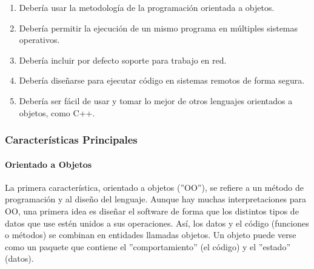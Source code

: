 \begin{description}
\begin{enumerate}
 \item Deber\'ia usar la metodolog\'ia de la programaci\'on orientada a objetos.
 \item Deber\'ia permitir la ejecuci\'on de un mismo programa en m\'ultiples sistemas operativos. 
 \item Deber\'ia incluir por defecto soporte para trabajo en red.
 \item Deber\'ia dise\~narse para ejecutar c\'odigo en sistemas remotos de forma segura.
 \item Deber\'ia ser f\'acil de usar y tomar lo mejor de otros lenguajes orientados a objetos, como C++.
\end{enumerate}

\subsubsection{Caracter\'isticas Principales}
\paragraph{Orientado a Objetos}
La primera caracter\'istica, orientado a objetos (''OO''), se refiere a un m\'etodo de programaci\'on y al
dise\~no del lenguaje. Aunque hay muchas interpretaciones para OO, una primera idea es dise\~nar el software de
forma que los distintos tipos de datos que use est\'en unidos a sus operaciones. As\'i, los datos y el c\'odigo
(funciones o m\'etodos) se combinan en entidades llamadas objetos. Un objeto puede verse como un paquete que
contiene el ''comportamiento'' (el c\'odigo) y el ''estado'' (datos).\\


\end{description}
